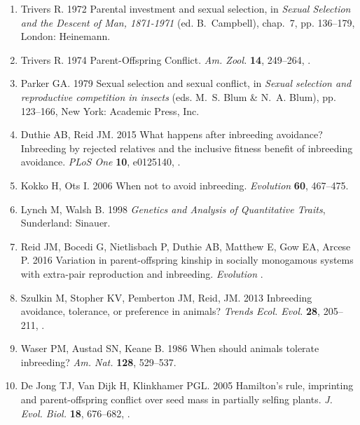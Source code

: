 \documentclass[12pt]{article}
\begin{document}
\begin{enumerate}
\item{Trivers R. 1972 {Parental investment and sexual selection}, in \textit{Sexual
  Selection and the Descent of Man, 1871-1971} (ed. B.~Campbell), chap.~7, pp.
  136--179, London: Heinemann.}

\item{Trivers R. 1974 {Parent-Offspring Conflict}. \textit{Am. Zool.}
  \textbf{14}, 249--264, .}

\item{Parker GA. 1979 {Sexual selection and sexual conflict}, in \textit{Sexual
  selection and reproductive competition in insects} (eds. M.~S. Blum \& N.~A.
  Blum), pp. 123--166, New York: Academic Press, Inc.}

\item{Duthie AB, Reid JM. 2015 {What happens after inbreeding avoidance?
  Inbreeding by rejected relatives and the inclusive fitness benefit of
  inbreeding avoidance}. \textit{PLoS One} \textbf{10}, e0125140,
  .}

\item{Kokko H, Ots I. 2006 {When not to avoid inbreeding}. \textit{Evolution}
  \textbf{60}, 467--475.}

\item{Lynch M, Walsh B. 1998 \textit{{Genetics and Analysis of Quantitative
  Traits}}, Sunderland: Sinauer.}

\item{Reid JM, Bocedi G, Nietlisbach P, Duthie AB, Matthew E, Gow
  EA, Arcese P. 2016 {Variation in parent-offspring kinship in socially
  monogamous systems with extra-pair reproduction and inbreeding}.
  \textit{Evolution} .}

\item{Szulkin M, Stopher KV, Pemberton JM, Reid, JM. 2013 {Inbreeding
  avoidance, tolerance, or preference in animals?} \textit{Trends Ecol. Evol.} 
  \textbf{28}, 205--211, .}

\item{Waser PM, Austad SN, Keane B. 1986 {When should animals tolerate
  inbreeding?} \textit{Am. Nat.} \textbf{128}, 529--537.}

\item{{De Jong} TJ, {Van Dijk} H, Klinkhamer PGL. 2005 {Hamilton's
  rule, imprinting and parent-offspring conflict over seed mass in partially
  selfing plants}. \textit{J. Evol. Biol.} \textbf{18},
  676--682, .}


\end{enumerate}
\end{document}

